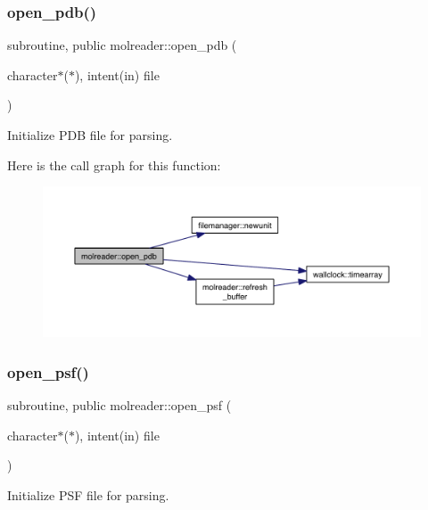 \subsubsection{\texorpdfstring{open\+\_\+pdb()}{open\_pdb()}}
{\footnotesize\ttfamily subroutine, public molreader\+::open\+\_\+pdb (\begin{DoxyParamCaption}\item[{character$\ast$($\ast$), intent(in)}]{file }\end{DoxyParamCaption})}



Initialize P\+DB file for parsing. 

Here is the call graph for this function\+:\nopagebreak
\begin{figure}[H]
\begin{center}
\leavevmode
\includegraphics[width=350pt]{namespacemolreader_a38a3903d901bc5e0b318bcc0dfd1b3ff_cgraph}
\end{center}
\end{figure}
\mbox{\label{namespacemolreader_a3ebd81391f00e3279bf262b2879af97a}} 
\subsubsection{\texorpdfstring{open\+\_\+psf()}{open\_psf()}}
{\footnotesize\ttfamily subroutine, public molreader\+::open\+\_\+psf (\begin{DoxyParamCaption}\item[{character$\ast$($\ast$), intent(in)}]{file }\end{DoxyParamCaption})}



Initialize P\+SF file for parsing. 

